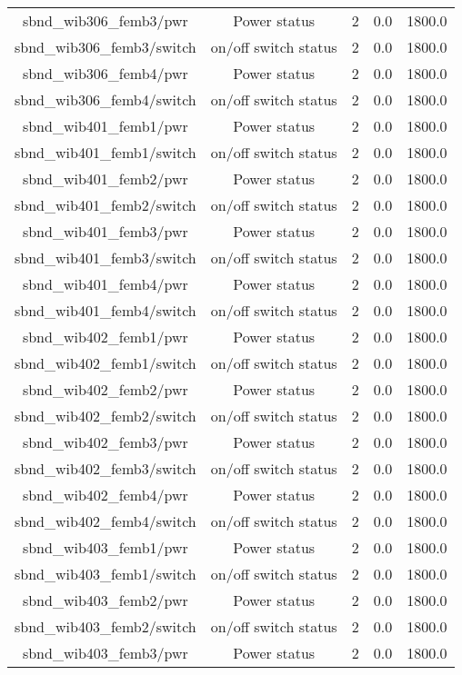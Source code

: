 \begin{center}
\begin{longtable}{c | c c c c }
sbnd\_wib306\_femb3/pwr & Power status & 2 & 0.0 & 1800.0\\ 
sbnd\_wib306\_femb3/switch & on/off switch status & 2 & 0.0 & 1800.0\\ 
sbnd\_wib306\_femb4/pwr & Power status & 2 & 0.0 & 1800.0\\ 
sbnd\_wib306\_femb4/switch & on/off switch status & 2 & 0.0 & 1800.0\\ 
sbnd\_wib401\_femb1/pwr & Power status & 2 & 0.0 & 1800.0\\ 
sbnd\_wib401\_femb1/switch & on/off switch status & 2 & 0.0 & 1800.0\\ 
sbnd\_wib401\_femb2/pwr & Power status & 2 & 0.0 & 1800.0\\ 
sbnd\_wib401\_femb2/switch & on/off switch status & 2 & 0.0 & 1800.0\\ 
sbnd\_wib401\_femb3/pwr & Power status & 2 & 0.0 & 1800.0\\ 
sbnd\_wib401\_femb3/switch & on/off switch status & 2 & 0.0 & 1800.0\\ 
sbnd\_wib401\_femb4/pwr & Power status & 2 & 0.0 & 1800.0\\ 
sbnd\_wib401\_femb4/switch & on/off switch status & 2 & 0.0 & 1800.0\\ 
sbnd\_wib402\_femb1/pwr & Power status & 2 & 0.0 & 1800.0\\ 
sbnd\_wib402\_femb1/switch & on/off switch status & 2 & 0.0 & 1800.0\\ 
sbnd\_wib402\_femb2/pwr & Power status & 2 & 0.0 & 1800.0\\ 
sbnd\_wib402\_femb2/switch & on/off switch status & 2 & 0.0 & 1800.0\\ 
sbnd\_wib402\_femb3/pwr & Power status & 2 & 0.0 & 1800.0\\ 
sbnd\_wib402\_femb3/switch & on/off switch status & 2 & 0.0 & 1800.0\\ 
sbnd\_wib402\_femb4/pwr & Power status & 2 & 0.0 & 1800.0\\ 
sbnd\_wib402\_femb4/switch & on/off switch status & 2 & 0.0 & 1800.0\\ 
sbnd\_wib403\_femb1/pwr & Power status & 2 & 0.0 & 1800.0\\ 
sbnd\_wib403\_femb1/switch & on/off switch status & 2 & 0.0 & 1800.0\\ 
sbnd\_wib403\_femb2/pwr & Power status & 2 & 0.0 & 1800.0\\ 
sbnd\_wib403\_femb2/switch & on/off switch status & 2 & 0.0 & 1800.0\\ 
sbnd\_wib403\_femb3/pwr & Power status & 2 & 0.0 & 1800.0\\ 

\end{longtable}
\end{center}
